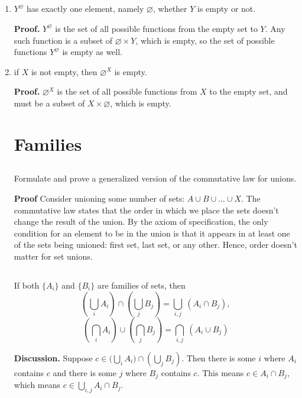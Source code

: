 \documentclass{article}
\begin{document}
\subsection{}
\begin{enumerate}[i]
    \item $Y^\varnothing$ has exactly one element, namely $\varnothing$, whether $Y$ is empty or not.
    
    \textbf{Proof.} $Y^\varnothing$ is the set of all possible functions from the empty set to $Y$. Any such function is a subset of $\varnothing \times Y$, which is empty, so the set of possible functions $Y^\varnothing$ is empty as well. 

    \item if $X$ is not empty, then $\varnothing^X$ is empty.

    \textbf{Proof.} $\varnothing^X$ is the set of all possible functions from $X$ to the empty set, and must be a subset of $X \times \varnothing$, which is empty.

\section{Families}

\subsection{} Formulate and prove a generalized version of the commutative law for unions.

\textbf{Proof} Consider unioning some number of sets: $A \cup B \cup \ldots \cup X$. The commutative law states that the order in which we place the sets doesn't change the result of the union. By the axiom of specification, the only condition for an element to be in the union is that it appears in at least one of the sets being unioned: first set, last set, or any other. Hence, order doesn't matter for set unions.

\subsection{} If both $\{A_i\}$ and $\{B_i\}$ are families of sets, then
$$\left(\bigcup_i A_i\right) \cap \left(\bigcup_j B_j\right) = \bigcup_{i, j} \ (A_i \cap B_j),$$
$$\left(\bigcap_i A_i \right) \cup \left(\bigcap_j B_j\right) = \bigcap_{i, j}\  (A_i \cup B_j)$$

\textbf{Discussion.} Suppose $c \in \Big(\bigcup_i A_i\Big) \cap \left(\bigcup_j B_j\right)$. Then there is some $i$ where $A_i$ contains $c$ and there is some $j$ where $B_j$ contains $c$. This means $c \in A_i \cap B_j$, which means $c \in \bigcup_{i, j} A_i \cap B_j$. 


\end{enumerate}
\end{document}
